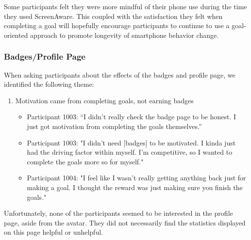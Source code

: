\documentclass[12pt, title page, manuscript, nonacm]{acmart}
\begin{document}
Some participants felt they were more mindful of their phone use during the time they used ScreenAware. This coupled with the satisfaction they felt when completing a goal will hopefully encourage participants to continue to use a goal-oriented approach to promote longevity of smartphone behavior change.
\subsubsection*{Badges/Profile Page}
When asking participants about the effects of the badges and profile page, we identified the following theme:
\begin{enumerate}
    \item Motivation came from completing goals, not earning badges
    \begin{itemize}
        \item Participant 1003: “I didn’t really check the badge page to be honest. I just got motivation from completing the goals themselves.”
        \item Participant 1003: "I didn't need [badges] to be motivated. I kinda just had the driving factor within myself. I'm competitive, so I wanted to complete the goals more so for myself."
        \item Participant 1004: "I feel like I wasn't really getting anything back just for making a goal. I thought the reward was just making sure you finish the goals."
    \end{itemize}
\end{enumerate}
Unfortunately, none of the participants seemed to be interested in the profile page, aside from the avatar. They did not necessarily find the statistics displayed on this page helpful or unhelpful.
\end{document}
